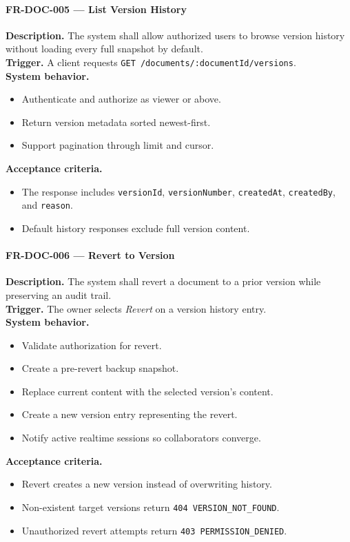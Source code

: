 \paragraph{FR-DOC-005 --- List Version History}
\textbf{Description.} The system shall allow authorized users to browse version history without loading
every full snapshot by default.\\
\textbf{Trigger.} A client requests \texttt{GET /documents/:documentId/versions}.\\
\textbf{System behavior.}
\begin{itemize}
  \item Authenticate and authorize as viewer or above.
  \item Return version metadata sorted newest-first.
  \item Support pagination through limit and cursor.
\end{itemize}
\textbf{Acceptance criteria.}
\begin{itemize}
  \item The response includes \texttt{versionId}, \texttt{versionNumber}, \texttt{createdAt}, \texttt{createdBy}, and \texttt{reason}.
  \item Default history responses exclude full version content.
\end{itemize}

\paragraph{FR-DOC-006 --- Revert to Version}
\textbf{Description.} The system shall revert a document to a prior version while preserving an audit trail.\\
\textbf{Trigger.} The owner selects \emph{Revert} on a version history entry.\\
\textbf{System behavior.}
\begin{itemize}
  \item Validate authorization for revert.
  \item Create a pre-revert backup snapshot.
  \item Replace current content with the selected version's content.
  \item Create a new version entry representing the revert.
  \item Notify active realtime sessions so collaborators converge.
\end{itemize}
\textbf{Acceptance criteria.}
\begin{itemize}
  \item Revert creates a new version instead of overwriting history.
  \item Non-existent target versions return \texttt{404 VERSION\_NOT\_FOUND}.
  \item Unauthorized revert attempts return \texttt{403 PERMISSION\_DENIED}.
\end{itemize}

